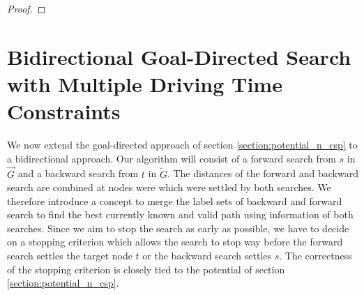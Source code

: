 \begin{proof}
\end{proof}




\section{Bidirectional Goal-Directed Search with Multiple Driving Time Constraints}
We now extend the goal-directed approach of section \ref{section:potential_n_csp} to a bidirectional approach. Our algorithm will consist of a forward search from $s$ in $\overrightarrow{G}$ and a backward search from $t$ in $\overleftarrow{G}$. The distances of the forward and backward search are combined at nodes were which were settled by both searches. We therefore introduce a concept to merge the label sets of backward and forward search to find the best currently known and valid path using information of both searches. Since we aim to stop the search as early as possible, we have to decide on a stopping criterion which allows the search to stop way before the forward search settles the target node $t$ or the backward search settles $s$. The correctness of the stopping criterion is closely tied to the potential of section \ref{section:potential_n_csp}.

